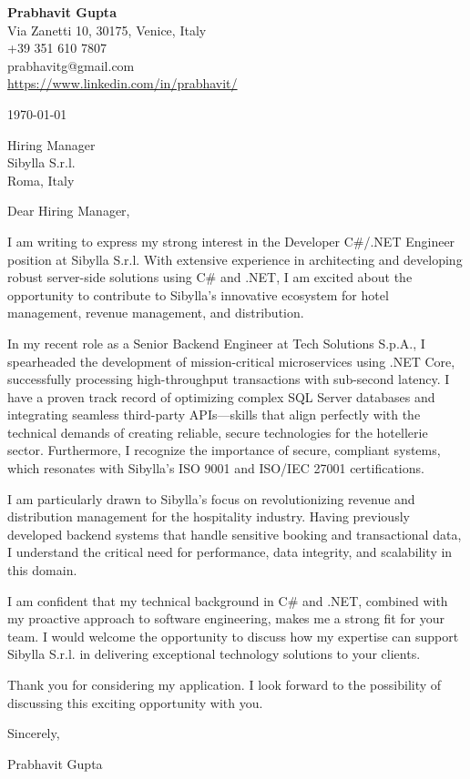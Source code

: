 \documentclass[11pt,a4paper]{article}
\begin{document}
\begin{flushleft}
\textbf{Prabhavit Gupta}\\
Via Zanetti 10, 30175, Venice, Italy\\
+39 351 610 7807\\
prabhavitg@gmail.com\\
\url{https://www.linkedin.com/in/prabhavit/}
\end{flushleft}

\vspace{2em}

\begin{flushleft}
\today
\end{flushleft}

\vspace{1em}

\begin{flushleft}
Hiring Manager\\
Sibylla S.r.l.\\
Roma, Italy
\end{flushleft}

\vspace{2em}

Dear Hiring Manager,

I am writing to express my strong interest in the Developer C\#/.NET Engineer position at Sibylla S.r.l. With extensive experience in architecting and developing robust server-side solutions using C\# and .NET, I am excited about the opportunity to contribute to Sibylla's innovative ecosystem for hotel management, revenue management, and distribution.

In my recent role as a Senior Backend Engineer at Tech Solutions S.p.A., I spearheaded the development of mission-critical microservices using .NET Core, successfully processing high-throughput transactions with sub-second latency. I have a proven track record of optimizing complex SQL Server databases and integrating seamless third-party APIs—skills that align perfectly with the technical demands of creating reliable, secure technologies for the hotellerie sector. Furthermore, I recognize the importance of secure, compliant systems, which resonates with Sibylla's ISO 9001 and ISO/IEC 27001 certifications.

I am particularly drawn to Sibylla's focus on revolutionizing revenue and distribution management for the hospitality industry. Having previously developed backend systems that handle sensitive booking and transactional data, I understand the critical need for performance, data integrity, and scalability in this domain. 

I am confident that my technical background in C\# and .NET, combined with my proactive approach to software engineering, makes me a strong fit for your team. I would welcome the opportunity to discuss how my expertise can support Sibylla S.r.l. in delivering exceptional technology solutions to your clients.

Thank you for considering my application. I look forward to the possibility of discussing this exciting opportunity with you.

Sincerely,

Prabhavit Gupta
\end{document}
